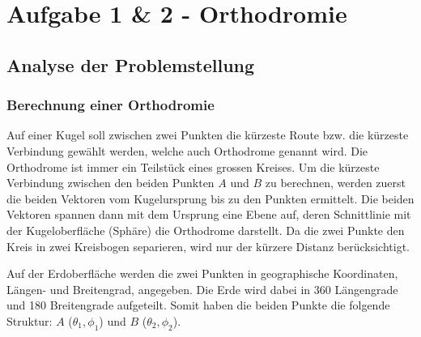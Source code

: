 \newcommand\DrawLatitudeCirclered[2][1]{
  \LatitudePlane{\angEl}{#2}
  \tikzset{current plane/.prefix style={scale=#1}}
  \pgfmathsetmacro\sinVis{sin(#2)/cos(#2)*sin(\angEl)/cos(\angEl)}
  \pgfmathsetmacro\angVis{asin(min(1,max(\sinVis,-1)))}
\draw[current plane,red,thick] (-50:1) arc (-50:-35:1);
}




\section{Aufgabe 1 \& 2 - Orthodromie}

\subsection{Analyse der Problemstellung}
\subsubsection{Berechnung einer Orthodromie}
Auf einer Kugel soll zwischen zwei Punkten die kürzeste Route bzw. die kürzeste Verbindung gewählt werden, welche auch Orthodrome genannt wird. Die Orthodrome ist immer ein Teilstück eines grossen Kreises. Um die kürzeste Verbindung zwischen den beiden Punkten $A$ und $B$ zu berechnen, werden zuerst die beiden Vektoren vom Kugelursprung bis zu den Punkten ermittelt. Die beiden Vektoren spannen dann mit dem Ursprung eine Ebene auf, deren Schnittlinie mit der Kugeloberfläche (Sphäre) die Orthodrome darstellt. Da die zwei Punkte den Kreis in zwei Kreisbogen separieren, wird nur der kürzere Distanz berücksichtigt.


Auf der Erdoberfläche werden die zwei Punkten in geographische Koordinaten, Längen- und Breitengrad, angegeben. Die Erde wird dabei in 360 Längengrade und 180 Breitengrade aufgeteilt. Somit haben die beiden Punkte die folgende Struktur: $A$ (\(\theta_1 , \phi_1\)) und $B$ (\(\theta_2 , \phi_2\)).

